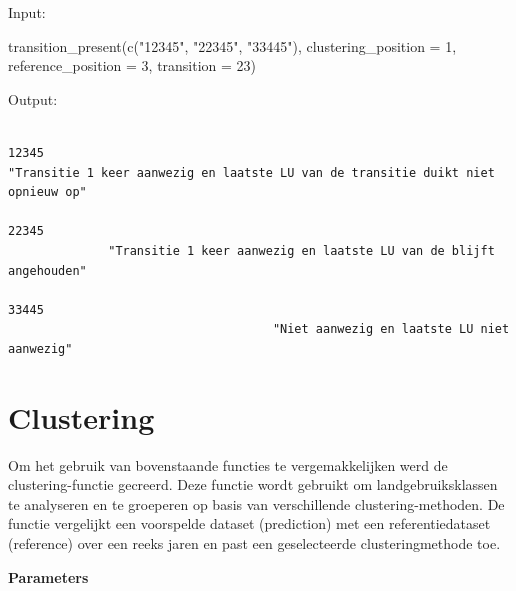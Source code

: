 \documentclass[twoside]{extreport}
\newenvironment{Shaded}{\begin{snugshade}}{\end{snugshade}}
\newcommand{\AttributeTok}[1]{\textcolor[rgb]{0.40,0.45,0.13}{#1}}
\newcommand{\DecValTok}[1]{\textcolor[rgb]{0.68,0.00,0.00}{#1}}
\newcommand{\FunctionTok}[1]{\textcolor[rgb]{0.28,0.35,0.67}{#1}}
\newcommand{\NormalTok}[1]{\textcolor[rgb]{0.00,0.23,0.31}{#1}}
\newcommand{\StringTok}[1]{\textcolor[rgb]{0.13,0.47,0.30}{#1}}
\begin{document}
Input:

\begin{Shaded}
\begin{Highlighting}[]
\FunctionTok{transition\_present}\NormalTok{(}\FunctionTok{c}\NormalTok{(}\StringTok{"12345"}\NormalTok{, }\StringTok{"22345"}\NormalTok{, }\StringTok{"33445"}\NormalTok{), }\AttributeTok{clustering\_position =} \DecValTok{1}\NormalTok{,}
         \AttributeTok{reference\_position =} \DecValTok{3}\NormalTok{, }\AttributeTok{transition =} \DecValTok{23}\NormalTok{)}
\end{Highlighting}
\end{Shaded}

Output:

\begin{verbatim}
                                                                           12345 
"Transitie 1 keer aanwezig en laatste LU van de transitie duikt niet opnieuw op" 
                                                                           22345 
              "Transitie 1 keer aanwezig en laatste LU van de blijft angehouden" 
                                                                           33445 
                                     "Niet aanwezig en laatste LU niet aanwezig" 
\end{verbatim}

\section{Clustering}\label{clustering-1}

Om het gebruik van bovenstaande functies te vergemakkelijken werd de
clustering-functie gecreerd. Deze functie wordt gebruikt om
landgebruiksklassen te analyseren en te groeperen op basis van
verschillende clustering-methoden. De functie vergelijkt een voorspelde
dataset (prediction) met een referentiedataset (reference) over een
reeks jaren en past een geselecteerde clusteringmethode toe.

\textbf{Parameters}
\end{document}
